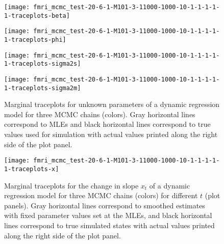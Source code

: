 \documentclass{article}
\begin{document}
\begin{figure}[ht]
\begin{minipage}{0.5\linewidth}
\texttt{[image: fmri\_mcmc\_test-20-6-1-M101-3-11000-1000-10-1-1-1-1-1-traceplots-beta]}
\end{minipage}
\begin{minipage}{0.5\linewidth}
\texttt{[image: fmri\_mcmc\_test-20-6-1-M101-3-11000-1000-10-1-1-1-1-1-traceplots-phi]}
\end{minipage}
\begin{minipage}{0.5\linewidth}
\texttt{[image: fmri\_mcmc\_test-20-6-1-M101-3-11000-1000-10-1-1-1-1-1-traceplots-sigma2s]}
\end{minipage}
\begin{minipage}{0.5\linewidth}
\texttt{[image: fmri\_mcmc\_test-20-6-1-M101-3-11000-1000-10-1-1-1-1-1-traceplots-sigma2m]}
\end{minipage}
\caption{Marginal traceplots for unknown parameters of a dynamic regression model for three MCMC chains (colors). Gray horizontal lines correspond to MLEs and black horizontal lines correspond to true values used for simulation with actual values printed along the right side of the plot panel.} \label{fig:tracetheta}
\end{figure}

\begin{figure}[ht]
\texttt{[image: fmri\_mcmc\_test-20-6-1-M101-3-11000-1000-10-1-1-1-1-1-traceplots-x]}
\caption{Marginal traceplots for the change in slope $x_t$ of a dynamic regression model for three MCMC chains (colors) for different $t$ (plot panels). Gray horizontal lines correspond to smoothed estimates with fixed parameter values set at the MLEs, and black horizontal lines correspond to true simulated states with actual values printed along the right side of the plot panel.} \label{fig:tracex}
\end{figure}
\end{document}
